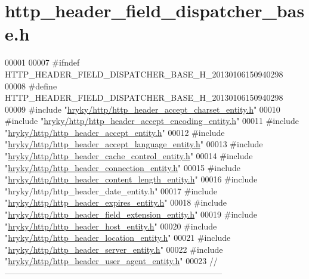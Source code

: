 \hypertarget{http__header__field__dispatcher__base_8h_source}{\section{http\-\_\-header\-\_\-field\-\_\-dispatcher\-\_\-base.\-h}
}

\begin{DoxyCode}
00001 
00007 \textcolor{preprocessor}{#ifndef HTTP\_HEADER\_FIELD\_DISPATCHER\_BASE\_H\_20130106150940298}
00008 \textcolor{preprocessor}{}\textcolor{preprocessor}{#define HTTP\_HEADER\_FIELD\_DISPATCHER\_BASE\_H\_20130106150940298}
00009 \textcolor{preprocessor}{}\textcolor{preprocessor}{#include "\hyperlink{http__header__accept__charset__entity_8h}{hryky/http/http_header_accept_charset_entity.h}"}
00010 \textcolor{preprocessor}{#include "\hyperlink{http__header__accept__encoding__entity_8h}{hryky/http/http_header_accept_encoding_entity.h}"}
00011 \textcolor{preprocessor}{#include "\hyperlink{http__header__accept__entity_8h}{hryky/http/http_header_accept_entity.h}"}
00012 \textcolor{preprocessor}{#include "\hyperlink{http__header__accept__language__entity_8h}{hryky/http/http_header_accept_language_entity.h}"}
00013 \textcolor{preprocessor}{#include "\hyperlink{http__header__cache__control__entity_8h}{hryky/http/http_header_cache_control_entity.h}"}
00014 \textcolor{preprocessor}{#include "\hyperlink{http__header__connection__entity_8h}{hryky/http/http_header_connection_entity.h}"}
00015 \textcolor{preprocessor}{#include "\hyperlink{http__header__content__length__entity_8h}{hryky/http/http_header_content_length_entity.h}"}
00016 \textcolor{preprocessor}{#include "hryky/http/http\_header\_date\_entity.h"}
00017 \textcolor{preprocessor}{#include "\hyperlink{http__header__expires__entity_8h}{hryky/http/http_header_expires_entity.h}"}
00018 \textcolor{preprocessor}{#include "\hyperlink{http__header__field__extension__entity_8h}{hryky/http/http_header_field_extension_entity.h}"}
00019 \textcolor{preprocessor}{#include "\hyperlink{http__header__host__entity_8h}{hryky/http/http_header_host_entity.h}"}
00020 \textcolor{preprocessor}{#include "\hyperlink{http__header__location__entity_8h}{hryky/http/http_header_location_entity.h}"}
00021 \textcolor{preprocessor}{#include "\hyperlink{http__header__server__entity_8h}{hryky/http/http_header_server_entity.h}"}
00022 \textcolor{preprocessor}{#include "\hyperlink{http__header__user__agent__entity_8h}{hryky/http/http_header_user_agent_entity.h}"}
00023 \textcolor{comment}{//
      ------------------------------------------------------------------------------}

\end{DoxyCode}
